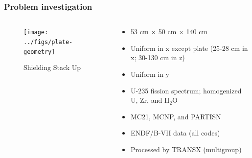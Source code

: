 \documentclass[xcolor=x11names,compress]{beamer}
\renewcommand{\(}{\begin{columns}}
\renewcommand{\)}{\end{columns}}
\newcommand{\<}[1]{\begin{column}{#1}}
\renewcommand{\>}{\end{column}}
\begin{document}
\begin{frame}[fragile]
  \frametitle{Problem investigation}
  	\begin{columns}
  	\begin{column}{0.4\textwidth}
  	\begin{figure}
  		\texttt{[image: ../figs/plate-geometry]}
  		\caption{Shielding Stack Up}
  	\end{figure}
  	\end{column}
 	\begin{column}{0.6\textwidth}
	\begin{itemize}
	\item 53 cm $\times$ 50 cm $\times$ 140 cm 
	\item Uniform in x except plate (25-28 cm in x; 30-130 cm in z)
	\item Uniform in y
	\item U-235 fission spectrum; homogenized U, Zr, and H$_2$O
	\vspace*{1 em}
	\item MC21, MCNP, and PARTISN
	\item ENDF/B-VII data (all codes)
	\item Processed by TRANSX (multigroup)
	\end{itemize}
  	\end{column}
	\end{columns}
  
\end{frame}
\end{document}
